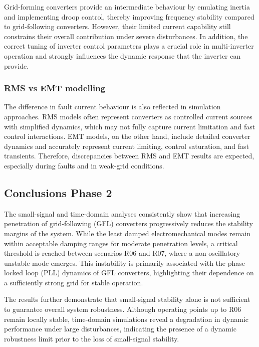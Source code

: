 Grid-forming converters provide an intermediate behaviour by emulating inertia and implementing droop control, thereby improving frequency stability compared to grid-following converters. However, their limited current capability still constrains their overall contribution under severe disturbances. In addition, the correct tuning of inverter control parameters plays a crucial role in multi-inverter operation and strongly influences the dynamic response that the inverter can provide.



\subsubsection{RMS vs EMT modelling}
The difference in fault current behaviour is also reflected in simulation approaches. RMS models often represent converters as controlled current sources with simplified dynamics, which may not fully capture current limitation and fast control interactions. EMT models, on the other hand, include detailed converter dynamics and accurately represent current limiting, control saturation, and fast transients. Therefore, discrepancies between RMS and EMT results are expected, especially during faults and in weak-grid conditions.


\subsection*{Conclusions Phase 2}

The small-signal and time-domain analyses consistently show that increasing penetration of grid-following (GFL) converters progressively reduces the stability margins of the system. While the least damped electromechanical modes remain within acceptable damping ranges for moderate penetration levels, a critical threshold is reached between scenarios R06 and R07, where a non-oscillatory unstable mode emerges. This instability is primarily associated with the phase-locked loop (PLL) dynamics of GFL converters, highlighting their dependence on a sufficiently strong grid for stable operation.

The results further demonstrate that small-signal stability alone is not sufficient to guarantee overall system robustness. Although operating points up to R06 remain locally stable, time-domain simulations reveal a degradation in dynamic performance under large disturbances, indicating the presence of a dynamic robustness limit prior to the loss of small-signal stability.

